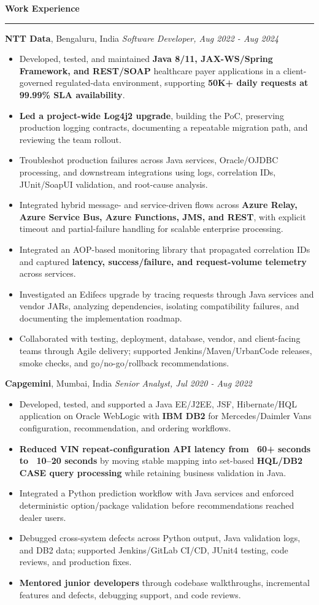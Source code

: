 \documentclass[11pt,letterpaper]{article}
\newcommand{\ressection}[1]{\Needspace{5\baselineskip}\vspace{8pt}\par\textbf{#1}\par\vspace{2pt}\hrule\vspace{5pt}}
\begin{document}
\ressection{Work Experience}
\textbf{NTT Data}, Bengaluru, India \hfill \textit{Software Developer, Aug 2022 - Aug 2024}
\begin{itemize}
  \item Developed, tested, and maintained \textbf{Java 8/11, JAX-WS/Spring Framework, and REST/SOAP} healthcare payer applications in a client-governed regulated-data environment, supporting \textbf{50K+ daily requests at 99.99\% SLA availability}.
  \item \textbf{Led a project-wide Log4j2 upgrade}, building the PoC, preserving production logging contracts, documenting a repeatable migration path, and reviewing the team rollout.
  \item Troubleshot production failures across Java services, Oracle/OJDBC processing, and downstream integrations using logs, correlation IDs, JUnit/SoapUI validation, and root-cause analysis.
  \item Integrated hybrid message- and service-driven flows across \textbf{Azure Relay, Azure Service Bus, Azure Functions, JMS, and REST}, with explicit timeout and partial-failure handling for scalable enterprise processing.
  \item Integrated an AOP-based monitoring library that propagated correlation IDs and captured \textbf{latency, success/failure, and request-volume telemetry} across services.
  \item Investigated an Edifecs upgrade by tracing requests through Java services and vendor JARs, analyzing dependencies, isolating compatibility failures, and documenting the implementation roadmap.
  \item Collaborated with testing, deployment, database, vendor, and client-facing teams through Agile delivery; supported Jenkins/Maven/UrbanCode releases, smoke checks, and go/no-go/rollback recommendations.
\end{itemize}
\textbf{Capgemini}, Mumbai, India \hfill \textit{Senior Analyst, Jul 2020 - Aug 2022}
\begin{itemize}
  \item Developed, tested, and supported a Java EE/J2EE, JSF, Hibernate/HQL application on Oracle WebLogic with \textbf{IBM DB2} for Mercedes/Daimler Vans configuration, recommendation, and ordering workflows.
  \item \textbf{Reduced VIN repeat-configuration API latency from ~60+ seconds to ~10--20 seconds} by moving stable mapping into set-based \textbf{HQL/DB2 CASE query processing} while retaining business validation in Java.
  \item Integrated a Python prediction workflow with Java services and enforced deterministic option/package validation before recommendations reached dealer users.
  \item Debugged cross-system defects across Python output, Java validation logs, and DB2 data; supported Jenkins/GitLab CI/CD, JUnit4 testing, code reviews, and production fixes.
  \item \textbf{Mentored junior developers} through codebase walkthroughs, incremental features and defects, debugging support, and code reviews.
\end{itemize}
\end{document}
